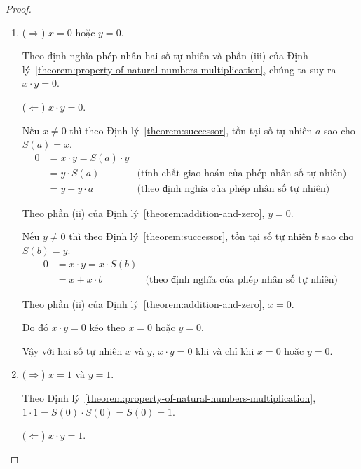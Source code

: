 \begin{proof}
    \begin{enumerate}[label={(\roman*)}]
        \item ($\Rightarrow$) $x = 0$ hoặc $y = 0$.

              Theo định nghĩa phép nhân hai số tự nhiên và phần (iii) của Định lý~\ref{theorem:property-of-natural-numbers-multiplication}, chúng ta suy ra $x\cdot y = 0$.

              ($\Leftarrow$) $x\cdot y = 0$.

              Nếu $x\ne 0$ thì theo Định lý~\ref{theorem:successor}, tồn tại số tự nhiên $a$ sao cho $S(a) = x$.
              \begin{align*}
                  0 & = x\cdot y = S(a)\cdot y                                                          \\
                    & = y\cdot S(a)            & \text{(tính chất giao hoán của phép nhân số tự nhiên)} \\
                    & = y + y\cdot a           & \text{(theo định nghĩa của phép nhân số tự nhiên)}
              \end{align*}

              Theo phần (ii) của Định lý~\ref{theorem:addition-and-zero}, $y = 0$.

              Nếu $y\ne 0$ thì theo Định lý~\ref{theorem:successor}, tồn tại số tự nhiên $b$ sao cho $S(b) = y$.
              \begin{align*}
                  0 & = x\cdot y = x\cdot S(b)                                                      \\
                    & = x + x\cdot b           & \text{(theo định nghĩa của phép nhân số tự nhiên)}
              \end{align*}

              Theo phần (ii) của Định lý~\ref{theorem:addition-and-zero}, $x = 0$.

              Do đó $x\cdot y = 0$ kéo theo $x = 0$ hoặc $y = 0$.

              Vậy với hai số tự nhiên $x$ và $y$, $x\cdot y = 0$ khi và chỉ khi $x = 0$ hoặc $y = 0$.
        \item ($\Rightarrow$) $x = 1$ và $y = 1$.

              Theo Định lý~\ref{theorem:property-of-natural-numbers-multiplication}, $1\cdot 1 = S(0)\cdot S(0) = S(0) = 1$.

              ($\Leftarrow$) $x\cdot y = 1$.


\end{enumerate}
\end{proof}

